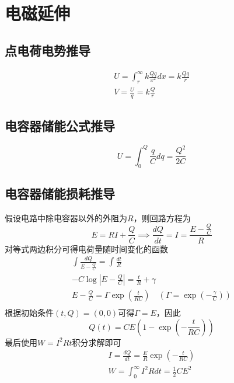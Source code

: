 
\section{电磁延伸}

\subsection{点电荷电势推导}

\begin{gather*}
    U=\int_r^\infty k\frac{Qq}{x^2}dx=k\frac{Qq}{r}\\
    V=\frac{U}{q}=k\frac{Q}{r}
\end{gather*}

\subsection{电容器储能公式推导}

\begin{equation*}
    U=\int_0^Q\frac{q}{C}dq=\frac{Q^2}{2C}
\end{equation*}

\subsection{电容器储能损耗推导}

假设电路中除电容器以外的外阻为$R$，则回路方程为
\begin{equation*}
    E=RI+\frac{Q}{C}\implies
    \frac{dQ}{dt}=I=\frac{E-\frac{Q}{C}}{R}
\end{equation*}
对等式两边积分可得电荷量随时间变化的函数
\begin{gather*}
    \int\frac{dQ}{E-\frac{Q}{C}}=\int\frac{dt}{R}\\
    -C\log\left\lvert E-\frac{Q}{C}\right\rvert=\frac{t}{R}+\gamma\\
    E-\frac{Q}{C}=\Gamma\exp\left(\frac{t}{RC}\right)\quad\left(\Gamma=\exp\left(-\frac{\gamma}{C}\right)\right)\\
\end{gather*}
根据初始条件$(t,Q)=(0,0)$可得$\Gamma=E$，因此
\begin{equation*}
    Q(t)=CE\left(1-\exp\left(-\frac{t}{RC}\right)\right)
\end{equation*}
最后使用$W=I^2Rt$积分求解即可
\begin{gather*}
    I=\frac{dQ}{dt}=\frac{E}{R}\exp\left(-\frac{t}{RC}\right)\\
    W=\int_0^\infty I^2Rdt=\frac12CE^2
\end{gather*}

